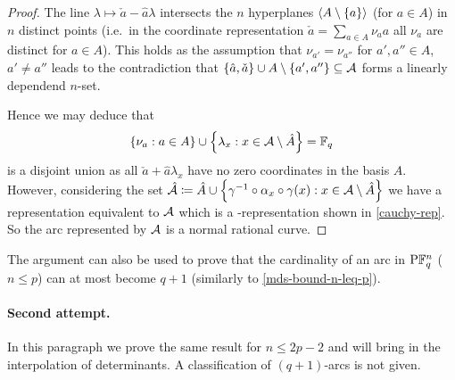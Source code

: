 \begin{proof}
    The line $\lambda\mapsto \check a-\hat a\lambda$ intersects the $n$ hyperplanes $\gen{A\setminus\set a}$ (for $a\in A$) in $n$ distinct points (i.e.~in the coordinate representation $\check a =\sum_{a\in A}{\nu_a a}$ all $\nu_a$ are distinct for $a\in A$). This holds as the assumption that $\nu_{a'}=\nu_{a''}$ for $a',a''\in A$, $a'\neq a''$ leads to the contradiction that $\set{\hat a,\check a}\setjoin A\setminus\set{a',a''}\setleq \cA$ forms a linearly dependend $n$-set.

    Hence we may deduce that
    $$
    \set{\nu_a:a\in A}\setjoin\set{\lambda_x:x\in \cA\setminus\hat A}=\field{q}
    $$ is a disjoint union as all $\check a+\hat a\lambda_x$ have no zero coordinates in the basis $A$. However, considering the set $\hat\cA\defeq \hat A\setjoin\set{\gamma^{-1}\compose\alpha_x\compose\gamma(x):x\in \cA\setminus\hat A}$ we have a representation equivalent to $\mathcal{A}$ which is a -representation shown in \autoref{cauchy-rep}. So the arc represented by $\mathcal{A}$ is a normal rational curve.
\end{proof}

\begin{remark}
    The argument can also be used to prove that the cardinality of an arc in $\P \field{q}^n$ ($n\leq p$) can at most become $q+1$ (similarly to \autoref{mds-bound-n-leq-p}).
\end{remark}

\paragraph{Second attempt.} In this paragraph we prove the same result for $n\leq 2p-2$ and will bring in the interpolation of determinants. A classification of $(q+1)$-arcs is not given.

